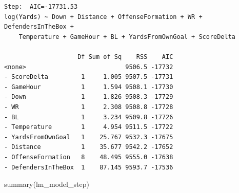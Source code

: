 \documentclass[
  super,
  preprint,
  3p]{elsarticle}
\newenvironment{Shaded}{\begin{snugshade}}{\end{snugshade}}
\newcommand{\FunctionTok}[1]{\textcolor[rgb]{0.28,0.35,0.67}{#1}}
\newcommand{\NormalTok}[1]{\textcolor[rgb]{0.00,0.23,0.31}{#1}}
\begin{document}
\begin{verbatim}
Step:  AIC=-17731.53
log(Yards) ~ Down + Distance + OffenseFormation + WR + DefendersInTheBox + 
    Temperature + GameHour + BL + YardsFromOwnGoal + ScoreDelta

                    Df Sum of Sq    RSS    AIC
<none>                           9506.5 -17732
- ScoreDelta         1     1.005 9507.5 -17731
- GameHour           1     1.594 9508.1 -17730
- Down               1     1.826 9508.3 -17729
- WR                 1     2.308 9508.8 -17728
- BL                 1     3.234 9509.8 -17726
- Temperature        1     4.954 9511.5 -17722
- YardsFromOwnGoal   1    25.767 9532.3 -17675
- Distance           1    35.677 9542.2 -17652
- OffenseFormation   8    48.495 9555.0 -17638
- DefendersInTheBox  1    87.145 9593.7 -17536
\end{verbatim}

\begin{Shaded}
\begin{Highlighting}[]
\FunctionTok{summary}\NormalTok{(lm\_model\_step)}
\end{Highlighting}
\end{Shaded}
\end{document}
